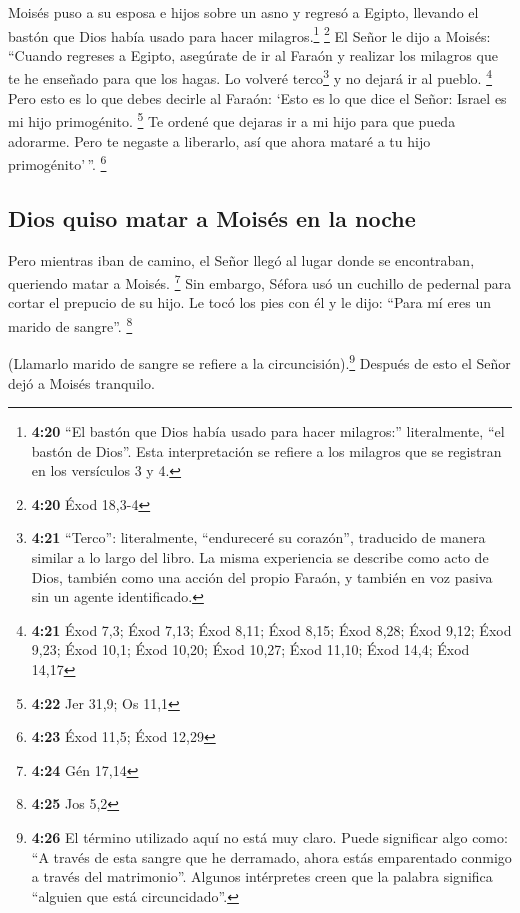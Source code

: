  Moisés puso a su esposa e hijos sobre un asno y regresó
a Egipto, llevando el bastón que Dios había usado para hacer
milagros.\footnote{\textbf{4:20} ``El bastón que Dios había usado para
  hacer milagros:'' literalmente, ``el bastón de Dios''. Esta
  interpretación se refiere a los milagros que se registran en los
  versículos 3 y 4.} \footnote{\textbf{4:20} Éxod 18,3-4}
 El Señor le dijo a Moisés: ``Cuando regreses a Egipto,
asegúrate de ir al Faraón y realizar los milagros que te he enseñado
para que los hagas. Lo volveré terco\footnote{\textbf{4:21} ``Terco'':
  literalmente, ``endureceré su corazón'', traducido de manera similar a
  lo largo del libro. La misma experiencia se describe como acto de
  Dios, también como una acción del propio Faraón, y también en voz
  pasiva sin un agente identificado.} y no dejará ir al pueblo.
\footnote{\textbf{4:21} Éxod 7,3; Éxod 7,13; Éxod 8,11; Éxod 8,15; Éxod
  8,28; Éxod 9,12; Éxod 9,23; Éxod 10,1; Éxod 10,20; Éxod 10,27; Éxod
  11,10; Éxod 14,4; Éxod 14,17}  Pero esto es lo que
debes decirle al Faraón: `Esto es lo que dice el Señor: Israel es mi
hijo primogénito. \footnote{\textbf{4:22} Jer 31,9; Os 11,1}
 Te ordené que dejaras ir a mi hijo para que pueda
adorarme. Pero te negaste a liberarlo, así que ahora mataré a tu hijo
primogénito'\,''. \footnote{\textbf{4:23} Éxod 11,5; Éxod 12,29}

\hypertarget{dios-quiso-matar-a-moisuxe9s-en-la-noche}{%
\subsection{Dios quiso matar a Moisés en la
noche}\label{dios-quiso-matar-a-moisuxe9s-en-la-noche}}

 Pero mientras iban de camino, el Señor llegó al lugar
donde se encontraban, queriendo matar a Moisés. \footnote{\textbf{4:24}
  Gén 17,14}  Sin embargo, Séfora usó un cuchillo de
pedernal para cortar el prepucio de su hijo. Le tocó los pies con él y
le dijo: ``Para mí eres un marido de sangre''. \footnote{\textbf{4:25}
  Jos 5,2}

 (Llamarlo marido de sangre se refiere a la
circuncisión).\footnote{\textbf{4:26} El término utilizado aquí no está
  muy claro. Puede significar algo como: ``A través de esta sangre que
  he derramado, ahora estás emparentado conmigo a través del
  matrimonio''. Algunos intérpretes creen que la palabra significa
  ``alguien que está circuncidado''.} Después de esto el Señor dejó a
Moisés tranquilo.

